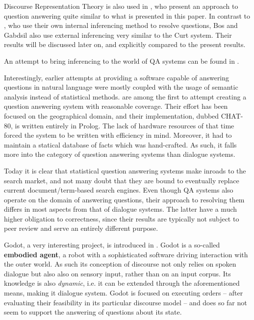 \documentclass[a4paper]{article}
\newcommand{\abbr}{\textsf} %
\newcommand{\term}[1]{\textsf{\textbf{#1}}} %
\newcommand{\pn}{\textsf} %
\newcommand{\curt}{\pn{Curt}}
\newcommand{\prol}{\pn{Prolog}}
\theoremstyle{remark}
\theoremstyle{remark}
\theoremstyle{definition}
\theoremstyle{definition}
\begin{document}
Discourse Representation Theory is also used in \cite{bosgabdsil}, who present
an approach to question answering quite similar to what is presented in this
paper. In contrast to \cite{tenCate}, who use their own internal inferencing
method to resolve questions, Bos and Gabdsil also use external inferencing very
similar to the \curt{} system. Their results will be discussed later on, and
explicitly compared to the present results.

An attempt to bring inferencing to the world of \abbr{QA} systems can be found
in \cite{webber}.

Interestingly, earlier attempts at providing a software capable of answering
questions in natural language were mostly coupled with the usage of
semantic analysis instead of statistical methods.
\cite{chat} are among  the first to attempt creating a question answering system
with reasonable coverage. Their effort has been focused on the geographical
domain, and their implementation, dubbed \pn{CHAT-80}, is written entirely in
\prol. The lack of hardware resources of that time forced the system to be
written with efficiency in mind. Moreover, it had to maintain a statical
database of facts which was hand-crafted. As such, it falls more into the
category of question answering systems than dialogue systems.

Today it is clear that statistical question answering systems make inroads to
the search market, and not many doubt that they are bound to eventually replace
current document/term-based search engines. Even though \abbr{QA} systems also
operate on the domain of answering questions, their approach to resolving them
differs in most aspects from that of dialogue systems. The latter have a much
higher obligation to correctness, since their results are typically not subject
to peer review and serve an entirely different purpose.

\pn{Godot}, a very interesting project, is introduced in \cite{godot}.
\pn{Godot} is a so-called \term{embodied agent}, a robot with a sophisticated
software driving interaction with the outer world. As such its conception of
discourse not only relies on spoken dialogue but also also on sensory input, rather
than on an input corpus. Its knowledge is also \emph{dynamic}, i.e. it can be
extended through the aforementioned means, making it
dialogue system.
\pn{Godot} is focused on executing orders -- after evaluating their feasibility
in its particular discourse model -- and does so far not seem to support the answering
of questions about its state.
\end{document}
